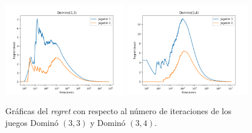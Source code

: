 \begin{figure}[h]
    \centering
    \includegraphics[width=0.48\textwidth]{graficas/cfr/domino/Domino(3,3).png}
    \includegraphics[width=0.48\textwidth]{graficas/cfr/domino/Domino(3,4).png}
    \caption{Gráficas del \textit{regret} con respecto al número de iteraciones de los juegos Dominó $(3, 3)$ y Dominó $(3, 4)$.}
    \label{fig:cfr-regret-domino-3-3}
\end{figure}
